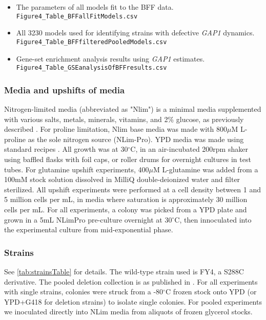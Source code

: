 \begin{itemize}
  \item The parameters of all models fit to the BFF data.
    \\\texttt{Figure4\_Table\_BFFallFitModels.csv}
    \label{itm:dme209allFits}
  \item All 3230 models used for identifying strains with defective 
    \textit{GAP1} dynamics.
    \\\texttt{Figure4\_Table\_BFFfilteredPooledModels.csv}
    \label{itm:dme209pooledFits}
  \item Gene-set enrichment analysis results using \textit{GAP1} 
    estimates.
    \\\texttt{Figure4\_Table\_GSEanalysisOfBFFresults.csv}
    \label{itm:dme209gsea}
\end{itemize}

\subsubsection{Media and upshifts of media}

Nitrogen-limited media (abbreviated as "Nlim") is a minimal media
supplemented with various salts, metals, minerals, vitamins, and
2\% glucose, as previously described
\parencite{airoldi2016steady,brauer2008coordination}. 
For proline limitation, 
Nlim base media was made with 800$\mu$M L-proline as the sole
nitrogen source (NLim-Pro).
YPD media was made using standard recipes \parencite{amberg2005methods}.
All growth was at 30$^{\circ}$C, in an air-incubated 200rpm shaker  
using baffled flasks with foil caps, or roller drums for 
overnight cultures in test tubes.
For glutamine upshift experiments, 
400$\mu$M L-glutamine was added from a 100mM stock solution dissolved 
in MilliQ double-deionized water and filter sterilized.
All upshift experiments were
performed at a cell density between 1 and 5 million cells per mL,
in media where saturation is approximately 30 million cells per mL. 
For all experiments, 
a colony was picked from a YPD plate and grown in a 5mL NLimPro 
pre-culture overnight at 30$^{\circ}$C, then innoculated into
the experimental culture from mid-exponential phase.

\subsubsection{Strains}

See \autoref{tab:strainsTable} for details.  
The wild-type strain used is FY4, a S288C derivative. 
The pooled deletion collection is as published in 
\cite{vandersluis2014broad}.
For all experiments with single strains, colonies were struck 
from a -80$^{\circ}$C frozen stock onto YPD (or YPD+G418 for
deletion strains) to isolate single colonies.
For pooled experiments we inoculated directly into NLim media
from aliquots of frozen glycerol stocks.

